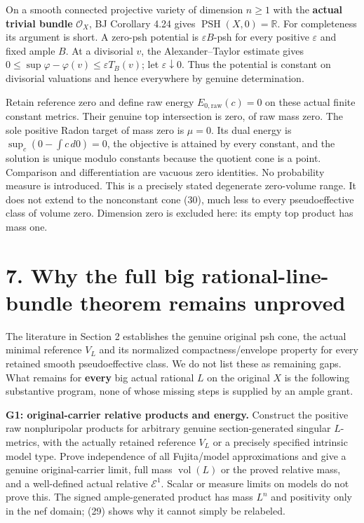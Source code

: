 \documentclass[
  10pt,
]{article}
\begin{document}
On a smooth connected projective variety of dimension \(n\ge1\) with the
\textbf{actual trivial bundle} \(\mathcal O_X\), BJ Corollary 4.24 gives
\(\operatorname{PSH}(X,0)=\mathbb R\). For completeness its argument is
short. A zero-psh potential is \(\varepsilon B\)-psh for every positive
\(\varepsilon\) and fixed ample \(B\). At a divisorial \(v\), the
Alexander--Taylor estimate gives
\(0\le\sup\varphi-\varphi(v)\le\varepsilon T_B(v)\); let
\(\varepsilon\downarrow0\). Thus the potential is constant on divisorial
valuations and hence everywhere by genuine determination.

Retain reference zero and define raw energy \(E_{0,\mathrm{raw}}(c)=0\)
on these actual finite constant metrics. Their genuine top intersection
is zero, of raw mass zero. The sole positive Radon target of mass zero
is \(\mu=0\). Its dual energy is \(\sup_c(0-\int c\,d0)=0\), the
objective is attained by every constant, and the solution is unique
modulo constants because the quotient cone is a point. Comparison and
differentiation are vacuous zero identities. No probability measure is
introduced. This is a precisely stated degenerate zero-volume range. It
does not extend to the nonconstant cone (30), much less to every
pseudoeffective class of volume zero. Dimension zero is excluded here:
its empty top product has mass one.

\section{7. Why the full big rational-line-bundle theorem remains
unproved}\label{why-the-full-big-rational-line-bundle-theorem-remains-unproved}

The literature in Section 2 establishes the genuine original psh cone,
the actual minimal reference \(V_L\) and its normalized
compactness/envelope property for every retained smooth pseudoeffective
class. We do not list these as remaining gaps. What remains for
\textbf{every} big actual rational \(L\) on the original \(X\) is the
following substantive program, none of whose missing steps is supplied
by an ample grant.

\textbf{G1: original-carrier relative products and energy.} Construct
the positive raw nonpluripolar products for arbitrary genuine
section-generated singular \(L\)-metrics, with the actually retained
reference \(V_L\) or a precisely specified intrinsic model type. Prove
independence of all Fujita/model approximations and give a genuine
original-carrier limit, full mass \(\operatorname{vol}(L)\) or the
proved relative mass, and a well-defined actual relative
\(\mathcal E^1\). Scalar or measure limits on models do not prove this.
The signed ample-generated product has mass \(L^n\) and positivity only
in the nef domain; (29) shows why it cannot simply be relabeled.
\end{document}
